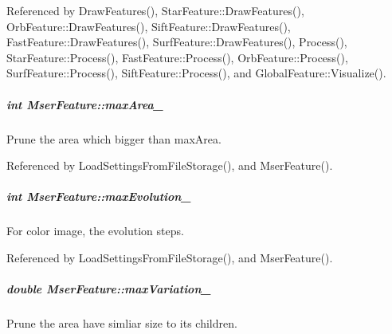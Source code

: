 Referenced by Draw\-Features(), Star\-Feature\-::\-Draw\-Features(), Orb\-Feature\-::\-Draw\-Features(), Sift\-Feature\-::\-Draw\-Features(), Fast\-Feature\-::\-Draw\-Features(), Surf\-Feature\-::\-Draw\-Features(), Process(), Star\-Feature\-::\-Process(), Fast\-Feature\-::\-Process(), Orb\-Feature\-::\-Process(), Surf\-Feature\-::\-Process(), Sift\-Feature\-::\-Process(), and Global\-Feature\-::\-Visualize().

\hypertarget{group___feature_extractor_a74d77b8596474323f1c4581ddf1d7fa2}{
\subparagraph[{max\-Area\-\_\-}]{\setlength{\rightskip}{0pt plus 5cm}int Mser\-Feature\-::max\-Area\-\_\-\hspace{0.3cm}{\ttfamily [private]}}}\label{group___feature_extractor_a74d77b8596474323f1c4581ddf1d7fa2}


Prune the area which bigger than max\-Area. 



Referenced by Load\-Settings\-From\-File\-Storage(), and Mser\-Feature().

\hypertarget{group___feature_extractor_a135d54a9a46522e800ef26ecfb8f18be}{
\subparagraph[{max\-Evolution\-\_\-}]{\setlength{\rightskip}{0pt plus 5cm}int Mser\-Feature\-::max\-Evolution\-\_\-\hspace{0.3cm}{\ttfamily [private]}}}\label{group___feature_extractor_a135d54a9a46522e800ef26ecfb8f18be}


For color image, the evolution steps. 



Referenced by Load\-Settings\-From\-File\-Storage(), and Mser\-Feature().

\hypertarget{group___feature_extractor_a9353f0657019b0177c8ce65c00d826f4}{
\subparagraph[{max\-Variation\-\_\-}]{\setlength{\rightskip}{0pt plus 5cm}double Mser\-Feature\-::max\-Variation\-\_\-\hspace{0.3cm}{\ttfamily [private]}}}\label{group___feature_extractor_a9353f0657019b0177c8ce65c00d826f4}


Prune the area have simliar size to its children. 



